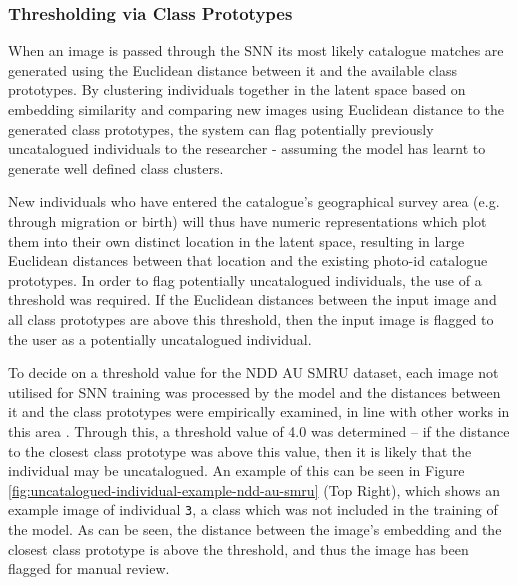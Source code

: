 \subsubsection{Thresholding via Class Prototypes}\label{ch:ID,sec:ModelSelection,subsec:UncataloguedIndividualThresholding,subsub:prototypes}

When an image is passed through the SNN its most likely catalogue matches are generated using the Euclidean distance between it and the available class prototypes. By clustering individuals together in the latent space based on embedding similarity and comparing new images using Euclidean distance to the generated class prototypes, the system can flag potentially previously uncatalogued individuals to the researcher - assuming the model has learnt to generate well defined class clusters. 

New individuals who have entered the catalogue's geographical survey area (e.g. through migration or birth) will thus have numeric representations which plot them into their own distinct location in the latent space, resulting in large Euclidean distances between that location and the existing photo-id catalogue prototypes. In order to flag potentially uncatalogued individuals, the use of a threshold was required. If the Euclidean distances between the input image and all class prototypes are above this threshold, then the input image is flagged to the user as a potentially uncatalogued individual. 

To decide on a threshold value for the NDD AU SMRU dataset, each image not utilised for SNN training was processed by the model and the distances between it and the class prototypes were empirically examined, in line with other works in this area \cite{battle_siamese_2022}. Through this, a threshold value of 4.0 was determined -- if the distance to the closest class prototype was above this value, then it is likely that the individual may be uncatalogued. An example of this can be seen in Figure \ref{fig:uncatalogued-individual-example-ndd-au-smru} (Top Right), which shows an example image of individual \texttt{3}, a class which was not included in the training of the model. As can be seen, the distance between the image's embedding and the closest class prototype is above the threshold, and thus the image has been flagged for manual review.

